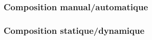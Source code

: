 





        \subsubsection{Composition manual/automatique}
        \label{sec:comp-manu}

        \subsubsection{Composition statique/dynamique}
        \label{sec:comp-stat}

